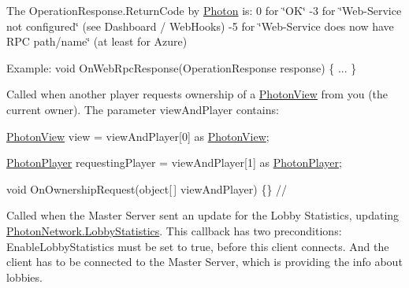 \begin{Desc}
\begin{description}
The Operation\+Response.\+Return\+Code by \hyperlink{namespace_photon}{Photon} is\+: 0 for \char`\"{}\+O\+K\char`\"{} -\/3 for \char`\"{}\+Web-\/\+Service not configured\char`\"{} (see Dashboard / Web\+Hooks) -\/5 for \char`\"{}\+Web-\/\+Service does now have R\+P\+C path/name\char`\"{} (at least for Azure)

Example\+: void On\+Web\+Rpc\+Response(\+Operation\+Response response) \{ ... \} \item[{\em 
On\+Ownership\+Request\hypertarget{group__public_api_ggaf30bbea51cc8c4b1ddc239d1c5c1468fac859a296d058a67508e48b2a0363e71c}{}\label{group__public_api_ggaf30bbea51cc8c4b1ddc239d1c5c1468fac859a296d058a67508e48b2a0363e71c}
}]Called when another player requests ownership of a \hyperlink{class_photon_view}{Photon\+View} from you (the current owner). The parameter view\+And\+Player contains\+:

\hyperlink{class_photon_view}{Photon\+View} view = view\+And\+Player\mbox{[}0\mbox{]} as \hyperlink{class_photon_view}{Photon\+View};

\hyperlink{class_photon_player}{Photon\+Player} requesting\+Player = view\+And\+Player\mbox{[}1\mbox{]} as \hyperlink{class_photon_player}{Photon\+Player}; 

void On\+Ownership\+Request(object\mbox{[}$\,$\mbox{]} view\+And\+Player) \{\} //\item[{\em 
On\+Lobby\+Statistics\+Update\hypertarget{group__public_api_ggaf30bbea51cc8c4b1ddc239d1c5c1468fab1a1f76626b99f398def802effe4908a}{}\label{group__public_api_ggaf30bbea51cc8c4b1ddc239d1c5c1468fab1a1f76626b99f398def802effe4908a}
}]Called when the Master Server sent an update for the Lobby Statistics, updating \hyperlink{class_photon_network_abdced09cccf61ae817cb97705ffce137}{Photon\+Network.\+Lobby\+Statistics}. This callback has two preconditions\+: Enable\+Lobby\+Statistics must be set to true, before this client connects. And the client has to be connected to the Master Server, which is providing the info about lobbies. \end{description}
\end{Desc}
